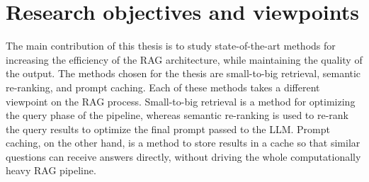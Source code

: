 \documentclass[12pt,a4paper,english,oneside]{article}
\begin{document}
\section{Research objectives and viewpoints}

The main contribution of this thesis is to study state-of-the-art methods for increasing the efficiency of the RAG architecture, while maintaining the quality of the output. The methods chosen for the thesis are small-to-big retrieval, semantic re-ranking, and prompt caching. Each of these methods takes a different viewpoint on the RAG process. Small-to-big retrieval is a method for optimizing the query phase of the pipeline, whereas semantic re-ranking is used to re-rank the query results to optimize the final prompt passed to the LLM. Prompt caching, on the other hand, is a method to store results in a cache so that similar questions can receive answers directly, without driving the whole computationally heavy RAG pipeline.
\end{document}

